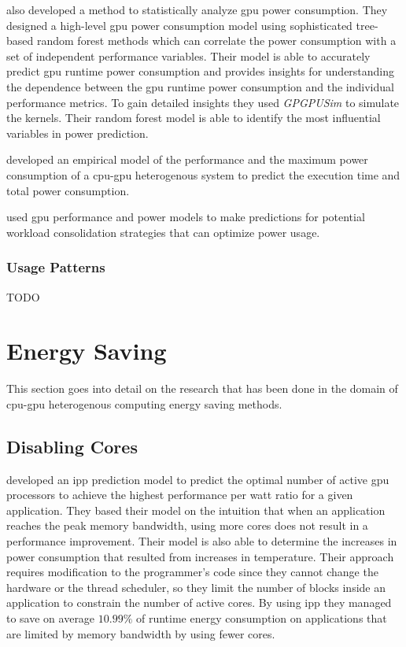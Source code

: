 				\textcite{Chen2011} also developed a method to statistically analyze \gls{gpu} power consumption.
				They designed a high-level \gls{gpu} power consumption model using sophisticated tree-based random forest methods which can correlate the power consumption with a set of independent performance variables.
				Their model is able to accurately predict \gls{gpu} runtime power consumption and provides insights for understanding the dependence between the \gls{gpu} runtime power consumption and the individual performance metrics.
				To gain detailed insights they used \emph{GPGPUSim} \parencite{Bakhoda2009} to simulate the kernels.
				Their random forest model is able to identify the most influential variables in power prediction.

				\textcite{Komoda2013} developed an empirical model of the performance and the maximum power consumption of a \gls{cpu}-\gls{gpu} heterogenous system to predict the execution time and total power consumption.

				\textcite{Li2011} used \gls{gpu} performance and power models to make predictions for potential workload consolidation strategies that can optimize power usage.

			\subsubsection{Usage Patterns}
				TODO

	\section{Energy Saving}
		This section goes into detail on the research that has been done in the domain of \gls{cpu}-\gls{gpu} heterogenous computing energy saving methods.

		\subsection{Disabling Cores}
			\textcite{Hong2010} developed an \gls{ipp} prediction model to predict the optimal number of active \gls{gpu} processors to achieve the highest performance per watt ratio for a given application.
			They based their model on the intuition that when an application reaches the peak memory bandwidth, using more cores does not result in a performance improvement.
			Their model is also able to determine the increases in power consumption that resulted from increases in temperature.
			Their approach requires modification to the programmer's code since they cannot change the hardware or the thread scheduler, so they limit the number of blocks inside an application to constrain the number of active cores.
			By using \gls{ipp} they managed to save on average $10.99 \%$ of runtime energy consumption on applications that are limited by memory bandwidth by using fewer cores.

